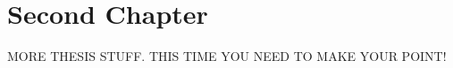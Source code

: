 \chapter{Second Chapter}

MORE THESIS STUFF.
THIS TIME YOU NEED \cite[stuff and things]{source2,source3} TO MAKE YOUR POINT!
